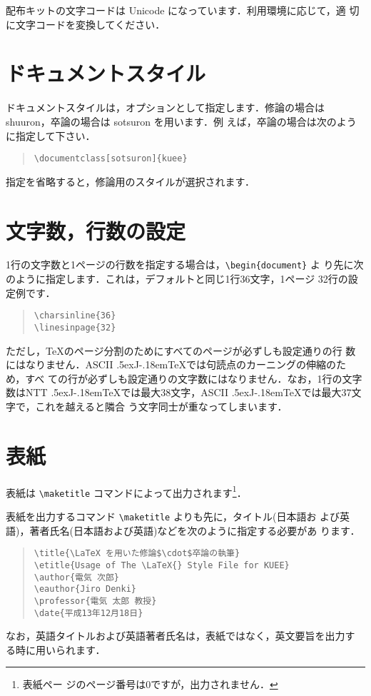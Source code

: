 \documentclass[sotsuron]{kuee}
\def\JTeX{\leavevmode\lower.5ex\hbox{J}\kern-.18em\TeX}
\begin{document}
配布キットの文字コードは Unicode になっています．利用環境に応じて，適
切に文字コードを変換してください．


\section{ドキュメントスタイル}

ドキュメントスタイルは，オプションとして指定します．修論の場合は
{\ttfamily shuuron}，卒論の場合は {\ttfamily sotsuron} を用います．例
えば，卒論の場合は次のように指定して下さい．
\begin{quote}
\begin{verbatim}
\documentclass[sotsuron]{kuee}
\end{verbatim}
\end{quote}
指定を省略すると，修論用のスタイルが選択されます．


\section{文字数，行数の設定}

1行の文字数と1ページの行数を指定する場合は，\verb+\begin{document}+ よ
り先に次のように指定します．これは，デフォルトと同じ1行36文字，1ページ
32行の設定例です．
\begin{quote}
\begin{verbatim}
\charsinline{36}
\linesinpage{32}
\end{verbatim}
\end{quote}
ただし，\TeX のページ分割のためにすべてのページが必ずしも設定通りの行
数にはなりません．ASCII \JTeX では句読点のカーニングの伸縮のため，すべ
ての行が必ずしも設定通りの文字数にはなりません．なお，1行の文字数はNTT
\JTeX では最大38文字，ASCII \JTeX では最大37文字で，これを越えると隣合
う文字同士が重なってしまいます．


\section{表紙}
表紙は \verb+\maketitle+ コマンドによって出力されます\footnote{表紙ペー
ジのページ番号は0ですが，出力されません．}．

表紙を出力するコマンド \verb+\maketitle+ よりも先に，タイトル(日本語お
よび英語)，著者氏名(日本語および英語)などを次のように指定する必要があ
ります．
\begin{quote}
\begin{verbatim}
\title{\LaTeX を用いた修論$\cdot$卒論の執筆}
\etitle{Usage of The \LaTeX{} Style File for KUEE}
\author{電気 次郎}
\eauthor{Jiro Denki}
\professor{電気 太郎 教授}
\date{平成13年12月18日}
\end{verbatim}
\end{quote}
なお，英語タイトルおよび英語著者氏名は，表紙ではなく，英文要旨を出力す
る時に用いられます．
\end{document}

